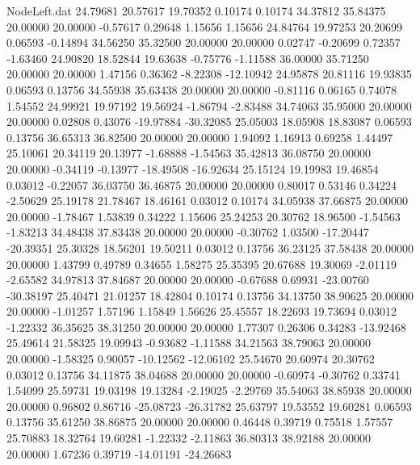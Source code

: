 \begin{filecontents}{NodeLeft.dat}
  24.79681   20.57617   19.70352     0.10174    0.10174   34.37812   35.84375   20.00000   20.00000   -0.57617    0.29648    1.15656    1.15656
  24.84764   19.97253   20.20699     0.06593   -0.14894   34.56250   35.32500   20.00000   20.00000    0.02747   -0.20699    0.72357   -1.63460
  24.90820   18.52844   19.63638    -0.75776   -1.11588   36.00000   35.71250   20.00000   20.00000    1.47156    0.36362   -8.22308  -12.10942
  24.95878   20.81116   19.93835     0.06593    0.13756   34.55938   35.63438   20.00000   20.00000   -0.81116    0.06165    0.74078    1.54552
  24.99921   19.97192   19.56924    -1.86794   -2.83488   34.74063   35.95000   20.00000   20.00000    0.02808    0.43076  -19.97884  -30.32085
  25.05003   18.05908   18.83087     0.06593    0.13756   36.65313   36.82500   20.00000   20.00000    1.94092    1.16913    0.69258    1.44497
  25.10061   20.34119   20.13977    -1.68888   -1.54563   35.42813   36.08750   20.00000   20.00000   -0.34119   -0.13977  -18.49508  -16.92634
  25.15124   19.19983   19.46854     0.03012   -0.22057   36.03750   36.46875   20.00000   20.00000    0.80017    0.53146    0.34224   -2.50629
  25.19178   21.78467   18.46161     0.03012    0.10174   34.05938   37.66875   20.00000   20.00000   -1.78467    1.53839    0.34222    1.15606
  25.24253   20.30762   18.96500    -1.54563   -1.83213   34.48438   37.83438   20.00000   20.00000   -0.30762    1.03500  -17.20447  -20.39351
  25.30328   18.56201   19.50211     0.03012    0.13756   36.23125   37.58438   20.00000   20.00000    1.43799    0.49789    0.34655    1.58275
  25.35395   20.67688   19.30069    -2.01119   -2.65582   34.97813   37.84687   20.00000   20.00000   -0.67688    0.69931  -23.00760  -30.38197
  25.40471   21.01257   18.42804     0.10174    0.13756   34.13750   38.90625   20.00000   20.00000   -1.01257    1.57196    1.15849    1.56626
  25.45557   18.22693   19.73694     0.03012   -1.22332   36.35625   38.31250   20.00000   20.00000    1.77307    0.26306    0.34283  -13.92468
  25.49614   21.58325   19.09943    -0.93682   -1.11588   34.21563   38.79063   20.00000   20.00000   -1.58325    0.90057  -10.12562  -12.06102
  25.54670   20.60974   20.30762     0.03012    0.13756   34.11875   38.04688   20.00000   20.00000   -0.60974   -0.30762    0.33741    1.54099
  25.59731   19.03198   19.13284    -2.19025   -2.29769   35.54063   38.85938   20.00000   20.00000    0.96802    0.86716  -25.08723  -26.31782
  25.63797   19.53552   19.60281     0.06593    0.13756   35.61250   38.86875   20.00000   20.00000    0.46448    0.39719    0.75518    1.57557
  25.70883   18.32764   19.60281    -1.22332   -2.11863   36.80313   38.92188   20.00000   20.00000    1.67236    0.39719  -14.01191  -24.26683

\end{filecontents}
